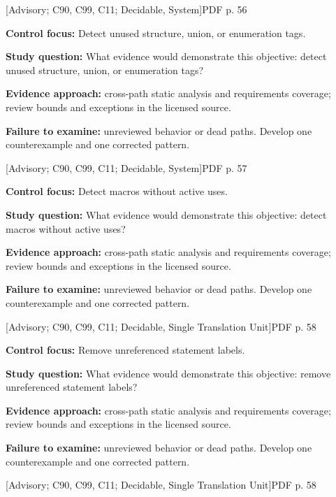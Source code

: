 \documentclass[10pt,letterpaper]{article}
\begin{document}
\smallskip
{}
 \textsf{\footnotesize [Advisory; C90, C99, C11; Decidable, System]}\hfill{\footnotesize PDF p. 56}\par
\textbf{Control focus:} Detect unused structure, union, or enumeration tags.\par
\textbf{Study question:} What evidence would demonstrate this objective: detect unused structure, union, or enumeration tags?\par
\textbf{Evidence approach:} cross-path static analysis and requirements coverage; review bounds and exceptions in the licensed source.\par
\textbf{Failure to examine:} unreviewed behavior or dead paths. Develop one counterexample and one corrected pattern.\par
\smallskip
{}
 \textsf{\footnotesize [Advisory; C90, C99, C11; Decidable, System]}\hfill{\footnotesize PDF p. 57}\par
\textbf{Control focus:} Detect macros without active uses.\par
\textbf{Study question:} What evidence would demonstrate this objective: detect macros without active uses?\par
\textbf{Evidence approach:} cross-path static analysis and requirements coverage; review bounds and exceptions in the licensed source.\par
\textbf{Failure to examine:} unreviewed behavior or dead paths. Develop one counterexample and one corrected pattern.\par
\smallskip
{}
 \textsf{\footnotesize [Advisory; C90, C99, C11; Decidable, Single Translation Unit]}\hfill{\footnotesize PDF p. 58}\par
\textbf{Control focus:} Remove unreferenced statement labels.\par
\textbf{Study question:} What evidence would demonstrate this objective: remove unreferenced statement labels?\par
\textbf{Evidence approach:} cross-path static analysis and requirements coverage; review bounds and exceptions in the licensed source.\par
\textbf{Failure to examine:} unreviewed behavior or dead paths. Develop one counterexample and one corrected pattern.\par
\smallskip
{}
 \textsf{\footnotesize [Advisory; C90, C99, C11; Decidable, Single Translation Unit]}\hfill{\footnotesize PDF p. 58}\par
\end{document}
